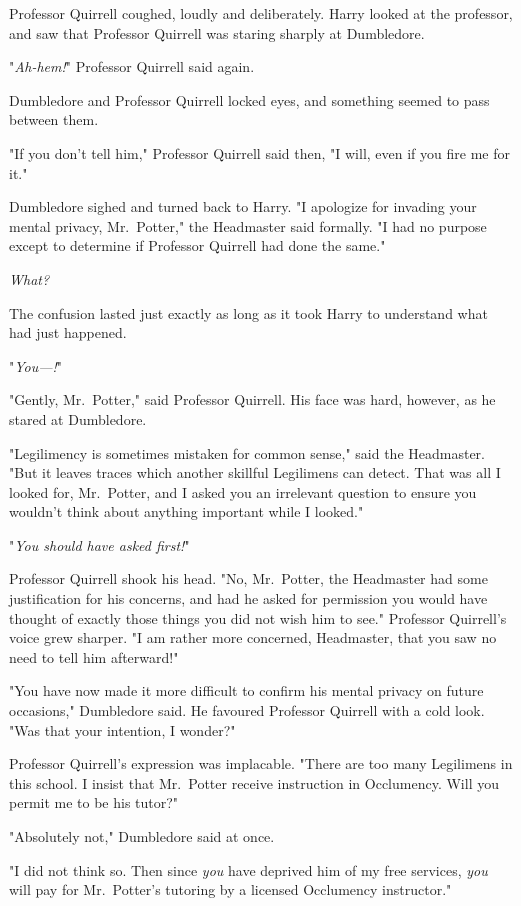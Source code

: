 Professor Quirrell coughed, loudly and deliberately. Harry looked at the
professor, and saw that Professor Quirrell was staring sharply at Dumbledore.

"\emph{Ah-hem!}" Professor Quirrell said again.

Dumbledore and Professor Quirrell locked eyes, and something seemed to pass
between them.

"If you don't tell him," Professor Quirrell said then, "I will, even if you
fire me for it."

Dumbledore sighed and turned back to Harry. "I apologize for invading your
mental privacy, Mr.~Potter," the Headmaster said formally. "I had no purpose
except to determine if Professor Quirrell had done the same."

\emph{What?}

The confusion lasted just exactly as long as it took Harry to understand what
had just happened.

"\emph{You---!}"

"Gently, Mr.~Potter," said Professor Quirrell. His face was hard, however, as
he stared at Dumbledore.

"Legilimency is sometimes mistaken for common sense," said the Headmaster. "But
it leaves traces which another skillful Legilimens can detect. That was all I
looked for, Mr.~Potter, and I asked you an irrelevant question to ensure you
wouldn't think about anything important while I looked."

"\emph{You should have asked first!}"

Professor Quirrell shook his head. "No, Mr.~Potter, the Headmaster had some
justification for his concerns, and had he asked for permission you would have
thought of exactly those things you did not wish him to see." Professor
Quirrell's voice grew sharper. "I am rather more concerned, Headmaster, that
you saw no need to tell him afterward!"

"You have now made it more difficult to confirm his mental privacy on future
occasions," Dumbledore said. He favoured Professor Quirrell with a cold look.
"Was that your intention, I wonder?"

Professor Quirrell's expression was implacable. "There are too many Legilimens
in this school. I insist that Mr.~Potter receive instruction in Occlumency.
Will you permit me to be his tutor?"

"Absolutely not," Dumbledore said at once.

"I did not think so. Then since \emph{you} have deprived him of my free
services, \emph{you} will pay for Mr.~Potter's tutoring by a licensed
Occlumency instructor."

